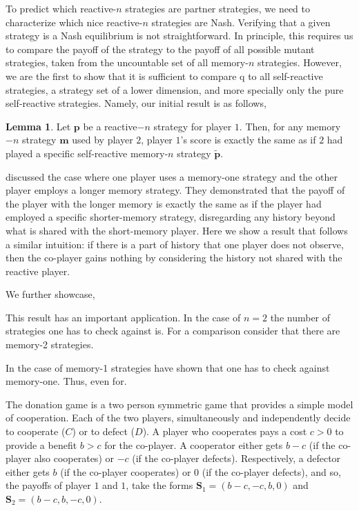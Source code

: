 \documentclass{article}
\theoremstyle{definition}
\newtheorem{lemma}[theorem]{Lemma}
\begin{document}
To predict which reactive-\(n\) strategies are partner strategies, we need to
characterize which nice reactive-\(n\) strategies are Nash. Verifying that a
given strategy is a Nash equilibrium is not straightforward. In principle, this
requires us to compare the payoff of the strategy to the payoff of all possible
mutant strategies, taken from the uncountable set of all memory-\(n\)
strategies. However, we are the first to show that it is sufficient to compare q
to all self-reactive strategies, a strategy set of a lower dimension, and more
specially only the pure self-reactive strategies. Namely, our initial result is
as follows,

\begin{lemma}\label{lemma:self_reactive_sufficiency}
  Let $\mathbf{p}$ be a reactive$-n$ strategy for player $1$. Then, for any
  memory$-n$ strategy $\mathbf{m}$ used by player $2$, player $1$'s score is
  exactly the same as if $2$ had played a specific self-reactive memory-$n$
  strategy $\mathbf{\tilde{p}}$.
\end{lemma}

\cite{press:PNAS:2012} discussed the case where one player uses a memory-one
strategy and the other player employs a longer memory strategy. They
demonstrated that the payoff of the player with the longer memory is exactly the
same as if the player had employed a specific shorter-memory strategy,
disregarding any history beyond what is shared with the short-memory player.
Here we show a result that follows a similar intuition: if there is a part of
history that one player does not observe, then the co-player gains nothing by
considering the history not shared with the reactive player.

We further showcase,

This result has an important application. In the case of \(n=2\) the number
of strategies one has to check against is. For a comparison consider that
there are memory-2 strategies.

In the case of memory-1 strategies have shown that one has to check against
memory-one. Thus, even for.




The donation game is a two person symmetric game that provides a simple model of
cooperation. Each of the two players, simultaneously and independently decide to
cooperate ($C$) or to defect ($D$). A player who cooperates pays a cost \(c >
0\) to provide a benefit \(b > c\) for the co-player. A cooperator either gets
\(b\!-\!c\) (if the co-player also cooperates) or \(-c\) (if the co-player
defects). Respectively, a defector either gets \(b\) (if the co-player
cooperates) or 0 (if the co-player defects), and so, the payoffs of player \(1\)
and \(1\), take the forms $\mathbf{S}_{1} = (b - c, -c, b, 0)$ and
$\mathbf{S}_{2} = (b - c, b, -c, 0)$.
\end{document}
